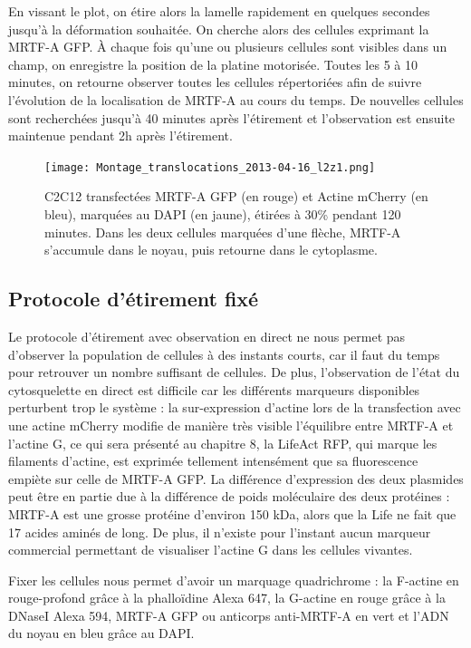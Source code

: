 	En vissant le plot, on étire alors la lamelle rapidement en quelques secondes jusqu'à la déformation souhaitée. On cherche alors des cellules exprimant la MRTF-A GFP. À chaque fois qu'une ou plusieurs cellules sont visibles dans un champ, on enregistre la position de la platine motorisée. Toutes les 5 à 10 minutes, on retourne observer toutes les cellules répertoriées afin de suivre l'évolution de la localisation de MRTF-A au cours du temps. De nouvelles cellules sont recherchées jusqu'à 40 minutes après l'étirement et l'observation est ensuite maintenue pendant 2h après l'étirement. 
	\begin{figure}
	\texttt{[image: Montage\_translocations\_2013-04-16\_l2z1.png]}
	\caption{C2C12 transfectées MRTF-A GFP (en rouge) et Actine mCherry (en bleu), marquées au DAPI (en jaune), étirées à 30\% pendant 120 minutes. Dans les deux cellules marquées d'une flèche, MRTF-A s'accumule dans le noyau, puis retourne dans le cytoplasme.}
	\label{Etirement_live}
	\end{figure}
	
	
	\subsection{Protocole d'étirement fixé}
	
	Le protocole d'étirement avec observation en direct ne nous permet pas d'observer la population de cellules à des instants courts, car il faut du temps pour retrouver un nombre suffisant de cellules. De plus, l'observation de l'état du cytosquelette en direct est difficile car les différents marqueurs disponibles perturbent trop le système : la sur-expression d'actine lors de la transfection avec une actine mCherry modifie de manière très visible l'équilibre entre MRTF-A et l'actine G, ce qui sera présenté au chapitre 8, la LifeAct RFP, qui marque les filaments d'actine, est exprimée tellement intensément que sa fluorescence empiète sur celle de MRTF-A GFP. La différence d'expression des deux plasmides peut être en partie due à la différence de poids moléculaire des deux protéines : MRTF-A est une grosse protéine d'environ 150 kDa, alors que la Life ne fait que 17 acides aminés de long. De plus, il n'existe pour l'instant aucun marqueur commercial permettant de visualiser l'actine G dans les cellules vivantes. 
	
	Fixer les cellules nous permet d'avoir un marquage quadrichrome : la F-actine en rouge-profond grâce à la phalloïdine Alexa 647, la G-actine en rouge grâce à la DNaseI Alexa 594, MRTF-A GFP ou anticorps anti-MRTF-A en vert et l'ADN du noyau en bleu grâce au DAPI. 
	
